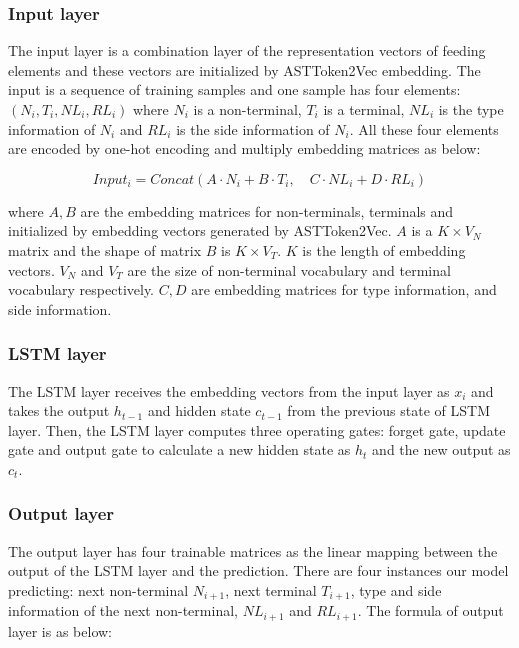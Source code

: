 \documentclass[E]{compsoft}
\begin{document}
\subsubsection{Input layer}
The input layer is a combination layer of the representation vectors of feeding elements and these vectors are initialized by ASTToken2Vec embedding.
The input is a sequence of training samples and one sample has four elements: $(N_{i}, T_{i}, NL_{i}, RL_{i})$ where $N_{i}$ is a non-terminal, $T_{i}$ is a terminal, $NL_{i}$ is the type information of $N_{i}$ and $RL_{i}$ is the side information of $N_{i}$. All these four elements are encoded by one-hot encoding and multiply embedding matrices as below:

\begin{equation}
Input_{i} = Concat(A\cdot N_{i} + B\cdot T_{i}, \quad C\cdot NL_{i} + D\cdot RL_{i})\label{equ:input}
\end{equation}

where $A, B$ are the embedding matrices for non-terminals, terminals and initialized by embedding vectors generated by ASTToken2Vec. $A$ is a $K \times V_{N} $ matrix and the shape of matrix $B$ is $K \times V_{T}$. $K$ is the length of embedding vectors. 
$V_{N}$ and $V_{T}$ are the size of non-terminal vocabulary and terminal vocabulary respectively. 
$C, D$ are embedding matrices for type information, and side information.


\subsubsection{LSTM layer}
The LSTM layer receives the embedding vectors from the input layer as $x_{i}$ and takes the output $h_{t-1}$ and hidden state $c_{t-1}$ from the previous state of LSTM layer. 
Then, the LSTM layer computes three operating gates: forget gate, update gate and output gate to calculate a new hidden state as $h_{t}$ and the new output as $c_{t}$.



\subsubsection{Output layer}
The output layer has four trainable matrices as the linear mapping between the output of the LSTM layer and the prediction. 
There are four instances our model predicting: 
next non-terminal $N_{i+1}$, next terminal $T_{i+1}$, type and side information of the next non-terminal, $NL_{i+1}$ and $RL_{i+1}$. 
The formula of output layer is as below:
\end{document}
